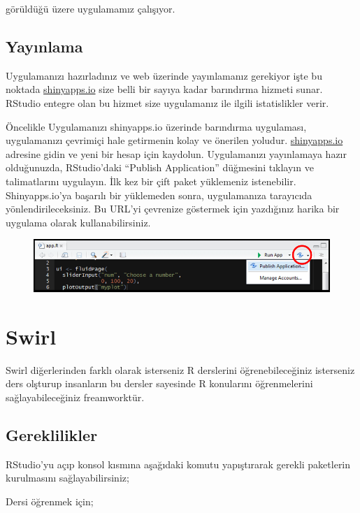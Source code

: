 \documentclass[]{book}
\begin{document}
görüldüğü üzere uygulamamız çalışıyor.

\section{Yayınlama}\label{yaynlama}

Uygulamanızı hazırladınız ve web üzerinde yayınlamanız gerekiyor işte bu
noktada \href{http://www.shinyapps.io/}{shinyapps.io} size belli bir
sayıya kadar barındırma hizmeti sunar. RStudio entegre olan bu hizmet
size uygulamanız ile ilgili istatislikler verir.

Öncelikle Uygulamanızı shinyapps.io üzerinde barındırma uygulaması,
uygulamanızı çevrimiçi hale getirmenin kolay ve önerilen yoludur.
\href{http://www.shinyapps.io/}{shinyapps.io} adresine gidin ve yeni bir
hesap için kaydolun. Uygulamanızı yayınlamaya hazır olduğunuzda,
RStudio'daki ``Publish Application'' düğmesini tıklayın ve talimatlarını
uygulayın. İlk kez bir çift paket yüklemeniz istenebilir.
Shinyapps.io'ya başarılı bir yüklemeden sonra, uygulamanıza tarayıcıda
yönlendirileceksiniz. Bu URL'yi çevrenize göstermek için yazdığınız
harika bir uygulama olarak kullanabilirsiniz.

\begin{figure}
\centering
\includegraphics{resim8.png}
\caption{}
\end{figure}

\chapter{Swirl}\label{swirl}

Swirl diğerlerinden farklı olarak isterseniz R derslerini
öğrenebileceğiniz isterseniz ders olşturup insanların bu dersler
sayesinde R konularını öğrenmelerini sağlayabileceğiniz freamworktür.

\section{Gereklilikler}\label{gereklilikler-3}

RStudio'yu açıp konsol kısmına aşağıdaki komutu yapıştırarak gerekli
paketlerin kurulmasını sağlayabilirsiniz;

Dersi öğrenmek için;
\end{document}
